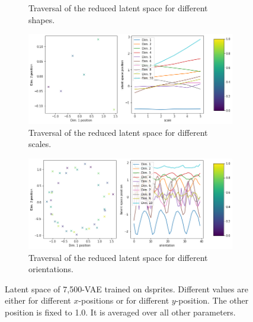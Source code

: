\begin{figure}[H]
\begin{subfigure}{.48\textwidth}
        \caption{Traversal of the reduced latent space for different shapes.}
    \end{subfigure}
    \begin{subfigure}{.48\textwidth}
        \includegraphics[width=\textwidth]{images/latent_space_traversals/vae_7500_dsprites_latent_space_values_scale.png}
        \caption{Traversal of the reduced latent space for different scales.}
    \end{subfigure}
    \begin{subfigure}{.48\textwidth}
        \includegraphics[width=\textwidth]{images/latent_space_traversals/vae_7500_dsprites_latent_space_values_orientation.png}
        \caption{Traversal of the reduced latent space for different orientations.}
    \end{subfigure}
    \caption[\ac{VAE} on dsprites: Latent Space Values]{Latent space of 7,500-\ac{VAE} trained on dsprites. Different values are either for different $x$-positions or for different $y$-position. The other position is fixed to 1.0. It is averaged over all other parameters.}
    \label{fig:vae_dsprite_7500_latent_space_position}
\end{figure}


